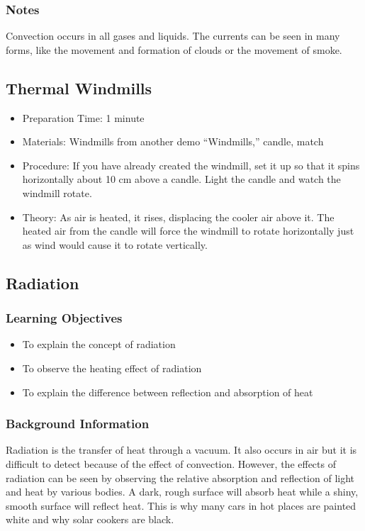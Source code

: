 \subsubsection*{Notes}
Convection occurs in all gases and liquids.  The currents can be seen in many forms, like the movement and formation of clouds or the movement of smoke.


\subsection{Thermal Windmills}
\begin{itemize}
\item{Preparation Time: 1 minute}
\item{Materials: Windmills from another demo “Windmills,” candle, match}
\item{Procedure: If you have already created the windmill, set it up so that it spins horizontally about 10 cm above a candle. Light the candle and watch the windmill rotate.}
\item{Theory: As air is heated, it rises, displacing the cooler air above it. The heated air from the candle will force the windmill to rotate horizontally just as wind would cause it to rotate vertically.}
\end{itemize}



\subsection{Radiation}

\subsubsection*{Learning Objectives}
\begin{itemize}
\item{To explain the concept of radiation}
\item{To observe the heating effect of radiation}
\item{To explain the difference between reflection and absorption of heat}
\end{itemize}

\subsubsection*{Background Information}
Radiation is the transfer of heat through a vacuum.  It also occurs in air but it is difficult to detect because of the effect of convection.
However, the effects of radiation can be seen by observing the relative absorption and reflection of light and heat by various bodies.  A dark, rough surface will absorb heat while a shiny, smooth surface will reflect heat.  This is why many cars in hot places are painted white and why solar cookers are black.

